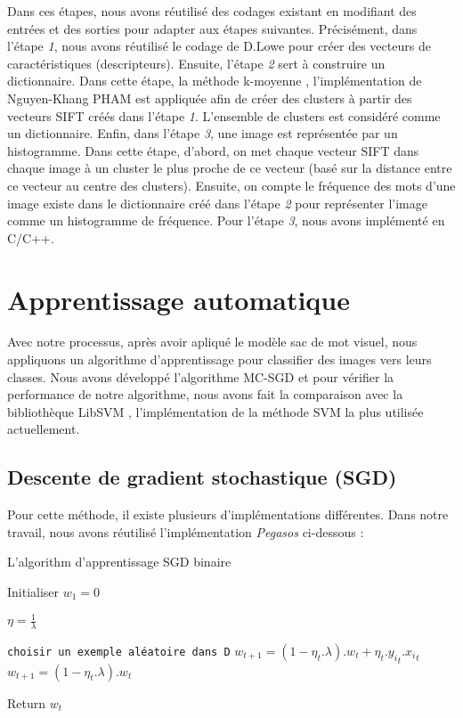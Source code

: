 Dans ces étapes, nous avons réutilisé des codages existant en modifiant des entrées et des sorties pour adapter aux étapes suivantes. Précisément, dans l'étape \textit{1}, nous avons réutilisé le codage de D.Lowe \cite{low99} pour créer des vecteurs de caractéristiques (descripteurs). Ensuite, l'étape \textit{2} sert à construire un dictionnaire. Dans cette étape, la méthode k-moyenne \cite{mq67}, l'implémentation de Nguyen-Khang PHAM \cite{khang} est appliquée afin de créer des clusters à partir des vecteurs SIFT créés dans l'étape \textit{1}. L'ensemble de clusters est considéré comme un dictionnaire. Enfin, dans l'étape \textit{3}, une image est représentée par un histogramme. Dans cette étape, d'abord, on met chaque vecteur SIFT dans chaque image à un cluster le plus proche de ce vecteur (basé sur la distance entre ce vecteur au centre des clusters). Ensuite, on compte le fréquence des mots d'une image existe dans le dictionnaire créé dans l'étape \textit{2} pour représenter l'image comme un histogramme de fréquence. Pour l'étape \textit{3}, nous avons implémenté en C/C++.

\section{Apprentissage automatique}
Avec notre processus, après avoir apliqué le modèle sac de mot visuel, nous appliquons un algorithme d'apprentissage pour classifier des images vers leurs classes. Nous avons développé l'algorithme MC-SGD et pour vérifier la performance de notre algorithme, nous avons fait la comparaison avec la bibliothèque LibSVM \cite{cl01}, l'implémentation de la méthode SVM la plus utilisée actuellement.

\subsection{Descente de gradient stochastique (SGD)}
Pour cette méthode, il existe plusieurs d'implémentations différentes. Dans notre travail, nous avons réutilisé l'implémentation \textit{Pegasos} \cite{sss07} ci-dessous :

\begin{algorithm}[H]
\caption{L'algorithm d'apprentissage SGD binaire}\label{sgdal}
\begin{algorithmic}[1]

\State Initialiser $w_1 = 0$


\State $\eta = \frac{1}{\lambda}$

\State \texttt{choisir un exemple aléatoire dans D}
\State $w_{t+1} = (1 - \eta_t.\lambda).w_t + \eta_t.{y_i}_t.{x_i}_t$
\Else
\State $w_{t+1} = (1 - \eta_t.\lambda).w_t$
\EndIf
\EndFor

\EndFor

\State Return $w_{t}$

\EndProcedure
\end{algorithmic}
\end{algorithm}


